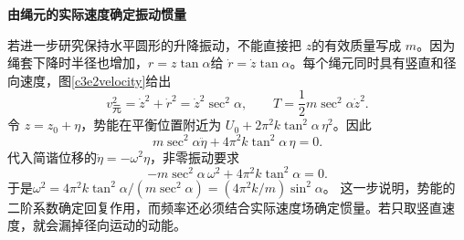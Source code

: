 \begin{solution}
\par\medskip{}\noindent\textbf{由绳元的实际速度确定振动惯量}\par\nobreak
若进一步研究保持水平圆形的升降振动，不能直接把 $z$的有效质量写成 $m$。因为绳套下降时半径也增加，$r=z\tan\alpha$给 $\dot r=\dot z\tan\alpha$。每个绳元同时具有竖直和径向速度，图\ref{c3e2velocity}给出
\[v_{\text{元}}^2=\dot z^2+\dot r^2=\dot z^2\sec^2\alpha,
\qquad T=\frac12m\sec^2\alpha\dot z^2.\]
令 $z=z_0+\eta$，势能在平衡位置附近为 $U_0+2\pi^2k\tan^2\alpha\,\eta^2$。因此
\[m\sec^2\alpha\ddot\eta+4\pi^2k\tan^2\alpha\,\eta=0.\]
代入简谐位移的$\ddot\eta=-\omega^2\eta$，非零振动要求
\[
-m\sec^2\alpha\,\omega^2+4\pi^2k\tan^2\alpha=0.
\]
于是$\omega^2=4\pi^2k\tan^2\alpha/(m\sec^2\alpha)
=(4\pi^2k/m)\sin^2\alpha$。
这一步说明，势能的二阶系数确定回复作用，而频率还必须结合实际速度场确定惯量。若只取竖直速度，就会漏掉径向运动的动能。
\end{solution}

